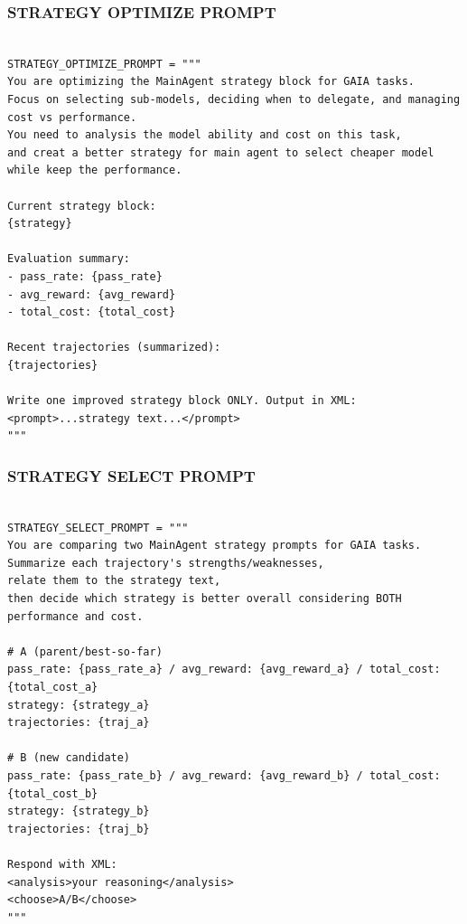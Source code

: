 \subsubsection{STRATEGY OPTIMIZE PROMPT}
\begin{tcolorbox}[title={\textbf{\small STRATEGY OPTIMIZE PROMPT }},   boxrule=1pt, arc=0mm,colback=black!5!white,colframe=darkgray,breakable, before skip=10pt, after skip=10pt,pad at break=2mm, parbox=false]
\begin{verbatim}

STRATEGY_OPTIMIZE_PROMPT = """
You are optimizing the MainAgent strategy block for GAIA tasks.
Focus on selecting sub-models, deciding when to delegate, and managing cost vs performance.
You need to analysis the model ability and cost on this task, 
and creat a better strategy for main agent to select cheaper model while keep the performance.

Current strategy block:
{strategy}

Evaluation summary:
- pass_rate: {pass_rate}
- avg_reward: {avg_reward}
- total_cost: {total_cost}

Recent trajectories (summarized):
{trajectories}

Write one improved strategy block ONLY. Output in XML:
<prompt>...strategy text...</prompt>
"""

\end{verbatim}
\end{tcolorbox}

\subsubsection{STRATEGY SELECT PROMPT}

\begin{tcolorbox}[title={\textbf{\small STRATEGY SELECT PROMPT }},   boxrule=1pt, arc=0mm,colback=black!5!white,colframe=darkgray,breakable, before skip=10pt, after skip=10pt,pad at break=2mm, parbox=false]
\begin{verbatim}

STRATEGY_SELECT_PROMPT = """
You are comparing two MainAgent strategy prompts for GAIA tasks.
Summarize each trajectory's strengths/weaknesses, 
relate them to the strategy text,
then decide which strategy is better overall considering BOTH performance and cost.

# A (parent/best-so-far)
pass_rate: {pass_rate_a} / avg_reward: {avg_reward_a} / total_cost: {total_cost_a}
strategy: {strategy_a}
trajectories: {traj_a}

# B (new candidate)
pass_rate: {pass_rate_b} / avg_reward: {avg_reward_b} / total_cost: {total_cost_b}
strategy: {strategy_b}
trajectories: {traj_b}

Respond with XML:
<analysis>your reasoning</analysis>
<choose>A/B</choose>
"""

\end{verbatim}
\end{tcolorbox}


